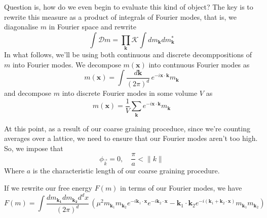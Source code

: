 Question is, how do we even begin to evaluate this kind of object? The key is to rewrite this measure as a product of integrals of Fourier modes, that is, we diagonalise $m$ in Fourier space and rewrite \[ \int \mathcal{D}m  = \prod_\mathbf{k} \mathcal{K} \int d m_\mathbf{ k } d m^*_\mathbf{k} \] 
In what follows, we'll be using both continuous and discrete decomppositions of $m$ into Fourier modes. We decompose $m( \mathbf{x} ) $ into contnuous Fourier modes as \[ m(\mathbf{x} ) = \int  \frac{d\mathbf{k}}{ ( 2 \pi )^d }\, e^{ - i \mathbf{x} \cdot \mathbf{k}}m_\mathbf{k} \] and decompose $m$ into discrete Fourier modes in some volume $V$ as \[ m(\mathbf{x} ) = \frac{1}{ V} \sum_\mathbf{k} e^{ - i \mathbf{x} \cdot \mathbf{k} }m_\mathbf{k} \] 

At this point, as a result of our coarse graining proceduce, since we're counting averages over a lattice, we need to ensure that our Fourier modes aren't too high. So, we impose that 
\[
 \phi_{\vec{k}} =0, \quad  \frac{\pi}{ a } < \| k \|  
\] Where $ a $ is the characteristic length of our coarse graining procedure. 

If we rewrite our free energy $F (m)$ in terms of our Fourier modes, we have \[ F(m) = \int \frac{d m_\mathbf{k_1} d m_\mathbf{k_2}d^d x}{( 2\pi )^d} \, \left( \mu^2 m_{\mathbf{k}_1} m_{\mathbf{k}_2} e^{ - i \mathbf{k}_1 \cdot \mathbf{x} } e^{ - i \mathbf{k}_2 \cdot \mathbf{x} } - \mathbf{k}_1 \cdot \mathbf{k}_2 e^{ - i ( \mathbf{k}_1 + \mathbf{k}_2  \cdot \mathbf{x} )}m_{\mathbf{k}_1} m_{\mathbf{k}_2} \right) \] 

